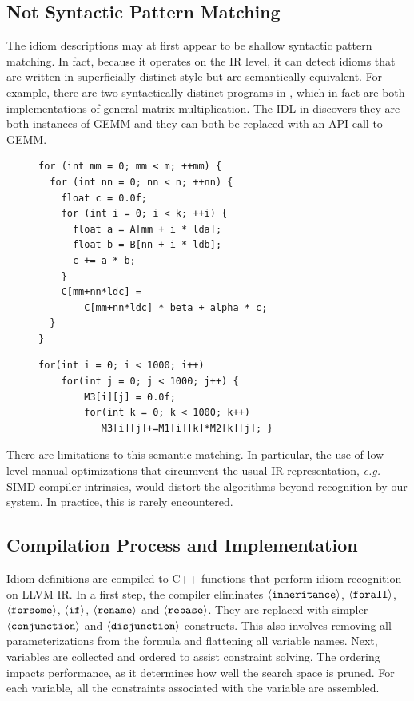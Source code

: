 \subsection{Not Syntactic Pattern Matching}
The idiom descriptions may at first appear to be shallow syntactic pattern matching.
In fact, because it operates on the IR level, it can detect idioms that are written in superficially distinct style but are semantically equivalent.
For example, there are two syntactically distinct programs in , which in fact are both implementations of general matrix multiplication.
The IDL in  discovers they are both instances of GEMM and they can both be replaced with an API call to GEMM.

\begin{figure}[ht]
\begin{lstlisting}[language=MyCpp]
for (int mm = 0; mm < m; ++mm) {
  for (int nn = 0; nn < n; ++nn) {
    float c = 0.0f;
    for (int i = 0; i < k; ++i) {
      float a = A[mm + i * lda]; 
      float b = B[nn + i * ldb];
      c += a * b;
    }
    C[mm+nn*ldc] =
        C[mm+nn*ldc] * beta + alpha * c;
  }
}
\end{lstlisting}
\begin{lstlisting}[language=MyCpp,label={fig:gemmexamples},caption=
   {Two matching instances of GEMM}]
for(int i = 0; i < 1000; i++)
    for(int j = 0; j < 1000; j++) {
        M3[i][j] = 0.0f;
        for(int k = 0; k < 1000; k++)
           M3[i][j]+=M1[i][k]*M2[k][j]; }
\end{lstlisting}
\end{figure}

    There are limitations to this semantic matching.
    In particular, the use of low level manual optimizations that circumvent the
    usual IR representation, {\em e.g.}  SIMD compiler intrinsics, would distort
    the algorithms beyond recognition by our system.
    In practice, this is rarely encountered.

\subsection{Compilation Process and Implementation}
\label{sec:compilation}

    Idiom definitions are compiled to C++ functions that perform idiom
    recognition on LLVM IR.
    In a first step, the compiler eliminates
    $\left<\text{\tt inheritance}\right>$, $\left<\text{\tt forall}\right>$,
    $\left<\text{\tt forsome}\right>$, $\left<\text{\tt if}\right>$,
    $\left<\text{\tt rename}\right>$ and $\left<\text{\tt rebase}\right>$.
    They are replaced with simpler $\left<\text{\tt conjunction}\right>$ and
    $\left<\text{\tt disjunction}\right>$ constructs.
    This also involves removing all parameterizations from the formula and
    flattening all variable names.
    Next, variables are collected and ordered to assist constraint solving.
    The ordering impacts performance, as it determines how well the search space
    is pruned. 
    For each variable, all the constraints associated with the variable are
    assembled.

